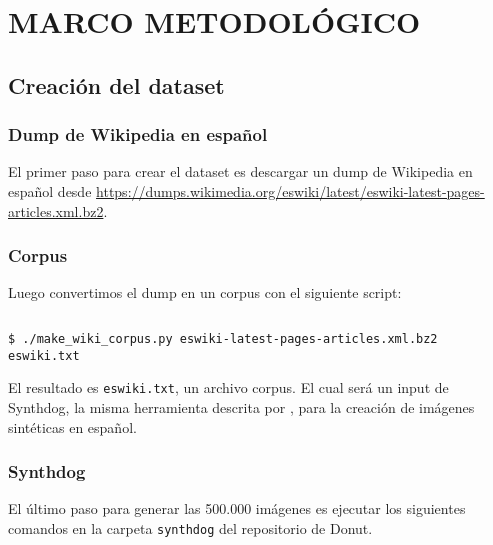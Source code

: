 \documentclass[../main.tex]{subfiles}
\begin{document}
\chapter{MARCO METODOLÓGICO}


\section{Creación del dataset}
\subsection{Dump de Wikipedia en español}

El primer paso para crear el dataset es descargar un dump de Wikipedia en español desde \url{https://dumps.wikimedia.org/eswiki/latest/eswiki-latest-pages-articles.xml.bz2}.

\subsection{Corpus}
Luego convertimos el dump en un corpus con el siguiente script:
\inputminted[bgcolor=codeBack, tabsize=2]{python}{make_wiki_corpus.py}
\begin{verbatim}
$ ./make_wiki_corpus.py eswiki-latest-pages-articles.xml.bz2 eswiki.txt
\end{verbatim}

El resultado es \texttt{eswiki.txt}, un archivo corpus.
El cual será un input de Synthdog, la misma herramienta descrita por \citet{kim2022ocrfree}, para la creación de imágenes sintéticas en español.

\subsection{Synthdog}

El último paso para generar las 500.000 imágenes es ejecutar los siguientes comandos en la carpeta \texttt{synthdog} del repositorio de Donut\cite{kim2022ocrfree}.
\end{document}
